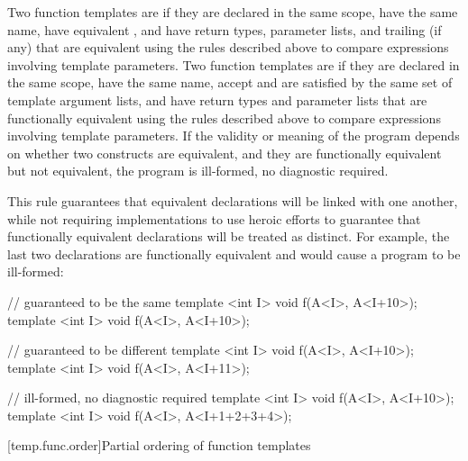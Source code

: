 \pnum
{}%
Two function templates are
if they
are declared in the same scope,
have the same name,
have equivalent ,
and
have return types, parameter lists,
and trailing  (if any)
that are equivalent using the rules described above to compare
expressions involving
template parameters.
%
%
Two function templates are
if they
are declared in the same scope,
have the same name,
accept and are satisfied by the same set of template argument lists,
and
have return types and parameter lists that
are functionally equivalent using the rules described above to
compare expressions involving
template parameters.
If the validity or meaning of the program depends on
whether two constructs are equivalent, and they are
functionally equivalent but not equivalent, the program is ill-formed,
no diagnostic required.

\pnum
\begin{note}
This rule guarantees that equivalent declarations will be linked with
one another, while not requiring implementations to use heroic efforts
to guarantee that functionally equivalent declarations will be treated
as distinct.
For example, the last two declarations are functionally
equivalent and would cause a program to be ill-formed:

\begin{codeblock}
// guaranteed to be the same
template <int I> void f(A<I>, A<I+10>);
template <int I> void f(A<I>, A<I+10>);

// guaranteed to be different
template <int I> void f(A<I>, A<I+10>);
template <int I> void f(A<I>, A<I+11>);

// ill-formed, no diagnostic required
template <int I> void f(A<I>, A<I+10>);
template <int I> void f(A<I>, A<I+1+2+3+4>);
\end{codeblock}
\end{note}

[temp.func.order]{Partial ordering of function templates}

